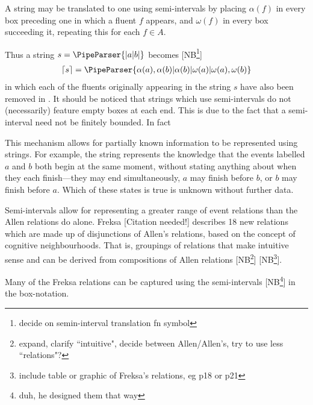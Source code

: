 \documentclass[a4paper,12pt,leqno]{article}
\newcommand{\vph}[1]{\vphantom{#1}}
\newcommand{\ebox}[1]{\fbox{$\vph{'(),}#1$}}
\newcommand{\EventString}[1]{%
	\renewcommand*{\do}[1]{\ebox{##1}}%
	\PipeParser{#1}%
}
\newcommand{\citeneeded}[1][]{{\color{red}[Citation needed!#1]}}
\newcommand{\selfnote}[1]{{\color{red}[NB\footnote{{\color{red}#1}}]}}
\newcommand{\nb}{\selfnote}
\begin{document}
A string may be translated to one using semi-intervals by placing $\alpha(f)$ in every box preceding one in which a fluent $f$ appears, and $\omega(f)$ in every box succeeding it, repeating this for each $f \in A$.\par
Thus a string $s = \EventString{{}|a|b|{}}$ becomes \nb{decide on semin-interval translation fn symbol}
\begin{align}
	\left\lceil s\right\rceil = \EventString{\alpha(a),\alpha(b)|\alpha(b)|\omega(a)|\omega(a),\omega(b)}
\end{align}
in which each of the fluents originally appearing in the string $s$ have also been removed in . It should be noticed that strings which use semi-intervals do not (necessarily) feature empty boxes at each end. This is due to the fact that a semi-interval need not be finitely bounded. In fact

This mechanism allows for partially known information to be represented using strings. For example, the string \EventString{\alpha(a), \alpha(b)|{}} represents the knowledge that the events labelled $a$ and $b$ both begin at the same moment, without stating anything about when they each finish---they may end simultaneously, $a$ may finish before $b$, or $b$ may finish before $a$. Which of these states is true is unknown without further data.

Semi-intervals allow for representing a greater range of event relations than the Allen relations do alone. Freksa \citeneeded{} describes 18 new relations which are made up of disjunctions of Allen's relations, based on the concept of cognitive neighbourhoods. That is, groupings of relations that make intuitive sense and can be derived from compositions of Allen relations \nb{expand, clarify ``intuitive", decide between Allen/Allen's, try to use less ``relations"?} \nb{include table or graphic of Freksa's relations, eg p18 or p21}.

Many of the Freksa relations can be captured using the semi-intervals \nb{duh, he designed them that way} in the box-notation.
\end{document}
